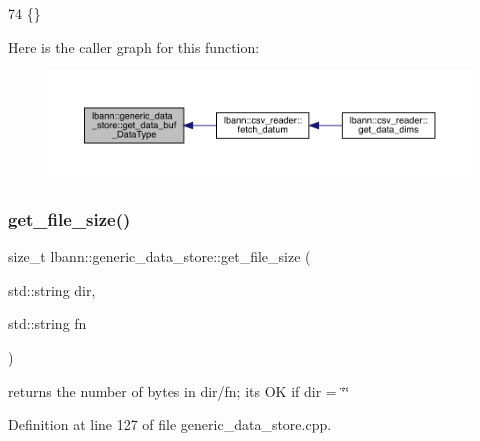 \begin{DoxyCode}
74 \{\}
\end{DoxyCode}
Here is the caller graph for this function\+:\nopagebreak
\begin{figure}[H]
\begin{center}
\leavevmode
\includegraphics[width=350pt]{classlbann_1_1generic__data__store_ab3f8b7fe6d6631059d92714d4277a983_icgraph}
\end{center}
\end{figure}
\mbox{\label{classlbann_1_1generic__data__store_a7641d15eba63426acf5071acb8026442}} 
\subsubsection{\texorpdfstring{get\+\_\+file\+\_\+size()}{get\_file\_size()}}
{\footnotesize\ttfamily size\+\_\+t lbann\+::generic\+\_\+data\+\_\+store\+::get\+\_\+file\+\_\+size (\begin{DoxyParamCaption}\item[{std\+::string}]{dir,  }\item[{std\+::string}]{fn }\end{DoxyParamCaption})\hspace{0.3cm}{\ttfamily [protected]}}



returns the number of bytes in dir/fn; it\textquotesingle{}s OK if dir = \char`\"{}\char`\"{} 



Definition at line 127 of file generic\+\_\+data\+\_\+store.\+cpp.


